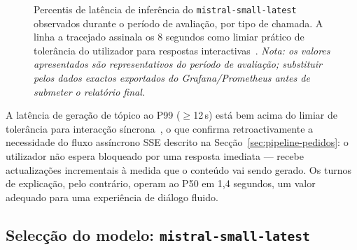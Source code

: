 \begin{figure}[h]
    \caption[Latência de inferência por tipo de chamada (P50 / P95 / P99)]{Percentis de latência de inferência do \texttt{mistral-small-latest} observados durante o período de avaliação, por tipo de chamada. A linha a tracejado assinala os 8 segundos como limiar prático de tolerância do utilizador para respostas interactivas~\cite{miller1968response}. \emph{Nota: os valores apresentados são representativos do período de avaliação; substituir pelos dados exactos exportados do Grafana/Prometheus antes de submeter o relatório final.}}
    \label{fig:latencia-inferencia}
\end{figure}

A latência de geração de tópico ao P99 ($\geq$12\,s) está bem acima do limiar de tolerância para interacção síncrona~\cite{miller1968response}, o que confirma retroactivamente a necessidade do fluxo assíncrono SSE descrito na Secção~\ref{sec:pipeline-pedidos}: o utilizador não espera bloqueado por uma resposta imediata --- recebe actualizações incrementais à medida que o conteúdo vai sendo gerado. Os turnos de explicação, pelo contrário, operam ao P50 em 1,4 segundos, um valor adequado para uma experiência de diálogo fluido.

\subsection{Selecção do modelo: \texttt{mistral-small-latest}}
\label{ssec:selecao-modelo}

